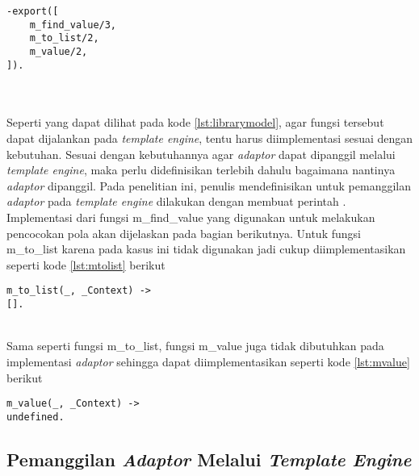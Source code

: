 \begin{minipage}{\linewidth}
\begin{lstlisting}[caption={Fungsi yang harus diekspor untuk model},label={lst:librarymodel}]
-export([
	m_find_value/3,
	m_to_list/2,
	m_value/2,
]).
\end{lstlisting}
\end{minipage}\\\\

Seperti yang dapat dilihat pada kode \ref{lst:librarymodel}, agar fungsi tersebut dapat dijalankan pada \textit{template engine}, tentu harus diimplementasi sesuai dengan kebutuhan. Sesuai dengan kebutuhannya agar \textit{adaptor} dapat dipanggil melalui \textit{template engine}, maka perlu didefinisikan terlebih dahulu bagaimana nantinya \textit{adaptor} dipanggil. Pada penelitian ini, penulis mendefinisikan untuk pemanggilan \textit{adaptor} pada \textit{template engine} dilakukan dengan membuat perintah . Implementasi dari fungsi m\_find\_value yang digunakan untuk melakukan pencocokan pola akan dijelaskan pada bagian berikutnya. Untuk fungsi m\_to\_list karena pada kasus ini tidak digunakan jadi cukup diimplementasikan seperti kode \ref{lst:mtolist} berikut

\begin{minipage}{\linewidth}
\begin{lstlisting}[caption={Implementasi fungsi m\_to\_list},label={lst:mtolist}]
m_to_list(_, _Context) ->
[].
\end{lstlisting}
\end{minipage}\\

Sama seperti fungsi m\_to\_list, fungsi m\_value juga tidak dibutuhkan pada implementasi \textit{adaptor} sehingga dapat diimplementasikan seperti kode \ref{lst:mvalue} berikut

\begin{minipage}{\linewidth}
\begin{lstlisting}[caption={Implementasi fungsi m\_value},label={lst:mvalue}]
m_value(_, _Context) ->
undefined.
\end{lstlisting}
\end{minipage}

\subsection{Pemanggilan \textit{Adaptor} Melalui \textit{Template Engine}}

